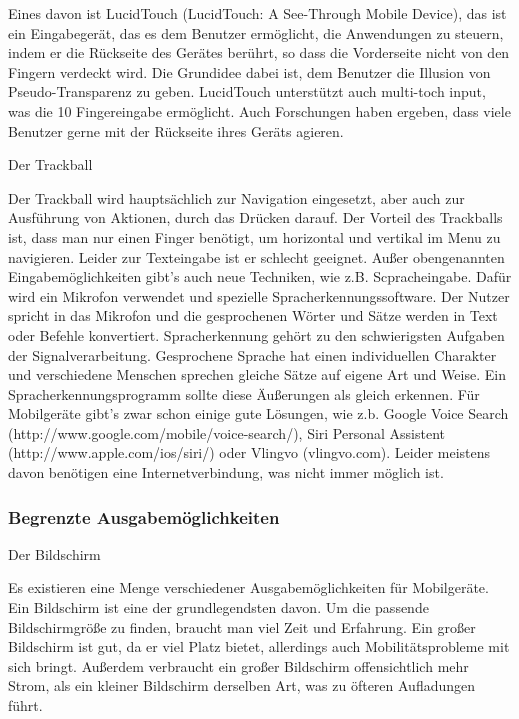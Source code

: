 Eines davon ist LucidTouch (LucidTouch: A See-Through Mobile Device), das ist ein Eingabegerät, das es dem Benutzer ermöglicht, die Anwendungen zu steuern, indem er die Rückseite des Gerätes berührt, so dass die Vorderseite nicht von den Fingern verdeckt wird. Die Grundidee dabei ist, dem Benutzer die Illusion von Pseudo-Transparenz zu geben. LucidTouch unterstützt auch multi-toch input, was die 10 Fingereingabe ermöglicht. Auch Forschungen haben ergeben, dass viele Benutzer gerne mit der Rückseite ihres Geräts agieren.

Der Trackball

Der Trackball wird hauptsächlich zur Navigation eingesetzt, aber auch zur Ausführung von Aktionen, durch das Drücken darauf. Der Vorteil des Trackballs ist, dass man nur einen Finger benötigt, um horizontal und vertikal im Menu zu navigieren. Leider zur Texteingabe ist er schlecht geeignet.
Außer obengenannten Eingabemöglichkeiten gibt’s auch neue Techniken, wie z.B. Scpracheingabe. Dafür wird ein Mikrofon verwendet und spezielle Spracherkennungssoftware. Der Nutzer spricht in das Mikrofon und die gesprochenen Wörter und Sätze werden in Text oder Befehle konvertiert. Spracherkennung  gehört zu den schwierigsten Aufgaben der Signalverarbeitung. Gesprochene Sprache hat einen individuellen Charakter und verschiedene Menschen sprechen gleiche Sätze auf eigene Art und Weise. Ein Spracherkennungsprogramm sollte diese Äußerungen als gleich erkennen. Für Mobilgeräte gibt’s zwar schon einige gute Lösungen, wie z.b. Google Voice Search (http://www.google.com/mobile/voice-search/), Siri Personal Assistent (http://www.apple.com/ios/siri/) oder Vlingvo (vlingvo.com). Leider meistens davon benötigen eine Internetverbindung, was nicht immer möglich ist.




\subsubsection{Begrenzte Ausgabemöglichkeiten} %
\label{ssub:einschr_nkungen_in_bedienung}

Der Bildschirm


Es existieren eine Menge verschiedener Ausgabemöglichkeiten für Mobilgeräte. Ein Bildschirm ist eine der grundlegendsten davon. Um die passende Bildschirmgröße zu finden, braucht man viel Zeit und Erfahrung. Ein großer Bildschirm ist gut, da er viel Platz bietet, allerdings auch Mobilitätsprobleme mit sich bringt. Außerdem verbraucht ein großer Bildschirm offensichtlich mehr Strom, als ein kleiner Bildschirm derselben Art, was zu öfteren Aufladungen führt. 

